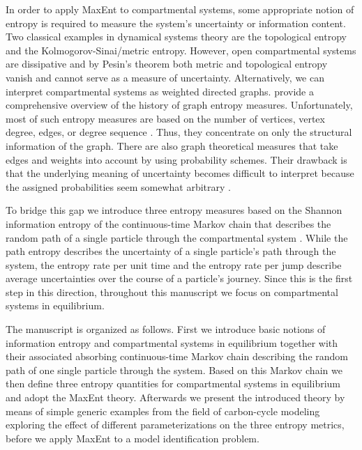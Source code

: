 \documentclass[smallextended]{svjour3}
\begin{document}
In order to apply MaxEnt to compartmental systems, some appropriate notion of entropy is required to measure the system's uncertainty or information content.
Two classical examples in dynamical systems theory are the topological entropy and the Kolmogorov-Sinai/metric entropy.
However, open compartmental systems are dissipative and by Pesin's theorem \citep{Pesin1977UMN} both metric and topological entropy vanish and cannot serve as a measure of uncertainty.
Alternatively, we can interpret compartmental systems as weighted directed graphs.
\citet{Dehmer2011IS} provide a comprehensive overview of the history of graph entropy measures.
Unfortunately, most of such entropy measures are based on the number of vertices, vertex degree, edges, or degree sequence \citep{Trucco1956BoMB}.
Thus, they concentrate on only the structural information of the graph.
There are also graph theoretical measures that take edges and weights into account by using probability schemes.
Their drawback is that the underlying meaning of uncertainty becomes difficult to interpret because the assigned probabilities seem somewhat arbitrary \citep{Bonchev2005}.

To bridge this gap we introduce three entropy measures based on the Shannon information entropy \citep{Shannon1949TUoIP} of the continuous-time Markov chain that describes the random path of a single particle through the compartmental system \citep{Metzler2018MGS}.
While the path entropy describes the uncertainty of a single particle's path through the system, the entropy rate per unit time and the entropy rate per jump describe average uncertainties over the course of a particle's journey.
Since this is the first step in this direction, throughout this manuscript we focus on compartmental systems in equilibrium.

The manuscript is organized as follows.
First we introduce basic notions of information entropy and compartmental systems in equilibrium together with their associated absorbing continuous-time Markov chain describing the random path of one single particle through the system.
Based on this Markov chain we then define three entropy quantities for compartmental systems in equilibrium and adopt the MaxEnt theory.
Afterwards we present the introduced theory by means of simple generic examples from the field of carbon-cycle modeling exploring the effect of different parameterizations on the three entropy metrics, before we apply MaxEnt to a model identification problem.
\end{document}
